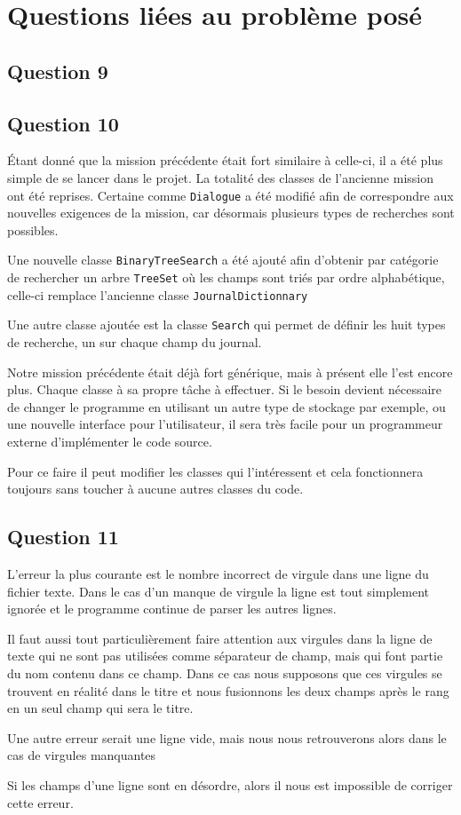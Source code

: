 \documentclass[11pt]{article}
\begin{document}
\section{Questions liées au problème posé}
\subsection*{Question 9}

\subsection*{Question 10}
Étant donné que la mission précédente était fort similaire à celle-ci, il a été plus simple de se lancer dans le projet. 
La totalité des classes de l'ancienne mission ont été reprises. Certaine comme \verb+Dialogue+ a été modifié afin de correspondre aux nouvelles exigences de la mission, car désormais plusieurs types de recherches sont possibles. 

Une nouvelle classe \verb+BinaryTreeSearch+ a été ajouté afin d'obtenir par catégorie de rechercher un arbre \verb+TreeSet+ où les champs sont triés par ordre alphabétique, celle-ci remplace l'ancienne classe \verb+JournalDictionnary+

Une autre classe ajoutée est la classe \verb+Search+ qui permet de définir les huit types de recherche, un sur chaque champ du journal.

Notre mission précédente était déjà fort générique, mais à présent elle l'est encore plus. Chaque classe à sa propre tâche à effectuer. Si le besoin devient nécessaire de changer le programme en utilisant un autre type de stockage par exemple, ou une nouvelle interface pour l'utilisateur, il sera très facile pour un programmeur externe d'implémenter le code source.

Pour ce faire il peut modifier les classes qui l'intéressent et cela fonctionnera toujours sans toucher à aucune autres classes du code.

\subsection*{Question 11}

L'erreur la plus courante est le nombre incorrect de virgule dans une ligne du fichier texte. Dans le cas d'un manque de virgule la ligne est tout simplement ignorée et le programme continue de parser les autres lignes.

Il faut aussi tout particulièrement faire attention aux virgules dans la ligne de texte qui ne sont pas utilisées comme séparateur de champ, mais qui font partie du nom contenu dans ce champ.
Dans ce cas nous supposons que ces virgules se trouvent en réalité dans le titre et nous fusionnons les deux champs après le rang en un seul champ qui sera le titre.

Une autre erreur serait une ligne vide, mais nous nous retrouverons alors dans le cas de virgules manquantes

Si les champs d'une ligne sont en désordre, alors il nous est impossible de corriger cette erreur.
\end{document}
